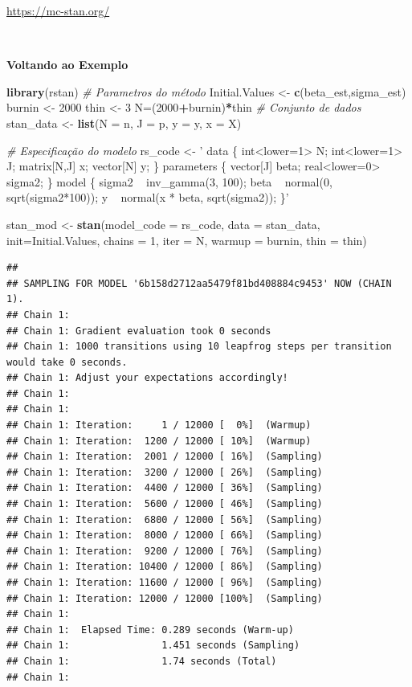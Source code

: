 \documentclass[
]{book}
\newenvironment{Shaded}{\begin{snugshade}}{\end{snugshade}}
\newcommand{\CommentTok}[1]{\textcolor[rgb]{0.56,0.35,0.01}{\textit{#1}}}
\newcommand{\DataTypeTok}[1]{\textcolor[rgb]{0.13,0.29,0.53}{#1}}
\newcommand{\DecValTok}[1]{\textcolor[rgb]{0.00,0.00,0.81}{#1}}
\newcommand{\KeywordTok}[1]{\textcolor[rgb]{0.13,0.29,0.53}{\textbf{#1}}}
\newcommand{\NormalTok}[1]{#1}
\newcommand{\OperatorTok}[1]{\textcolor[rgb]{0.81,0.36,0.00}{\textbf{#1}}}
\newcommand{\StringTok}[1]{\textcolor[rgb]{0.31,0.60,0.02}{#1}}
\begin{document}
\url{https://mc-stan.org/}

\(~\)

\textbf{Voltando ao Exemplo}

\begin{Shaded}
\begin{Highlighting}[]
\KeywordTok{library}\NormalTok{(rstan)}
\CommentTok{# Parametros do método}
\NormalTok{Initial.Values <-}\StringTok{ }\KeywordTok{c}\NormalTok{(beta_est,sigma_est)}
\NormalTok{burnin <-}\StringTok{ }\DecValTok{2000}
\NormalTok{thin <-}\StringTok{ }\DecValTok{3}
\NormalTok{N=(}\DecValTok{2000}\OperatorTok{+}\NormalTok{burnin)}\OperatorTok{*}\NormalTok{thin}
\CommentTok{# Conjunto de dados}
\NormalTok{stan_data <-}\StringTok{ }\KeywordTok{list}\NormalTok{(}\DataTypeTok{N =}\NormalTok{ n, }\DataTypeTok{J =}\NormalTok{ p, }\DataTypeTok{y =}\NormalTok{ y, }\DataTypeTok{x =}\NormalTok{ X)}

\CommentTok{# Especificação do modelo}
\NormalTok{rs_code <-}\StringTok{ '}
\StringTok{  data \{}
\StringTok{    int<lower=1> N;}
\StringTok{    int<lower=1> J;}
\StringTok{    matrix[N,J] x;}
\StringTok{    vector[N] y;}
\StringTok{  \}}
\StringTok{  parameters \{}
\StringTok{    vector[J] beta;}
\StringTok{    real<lower=0> sigma2;}
\StringTok{  \}}
\StringTok{  model \{}
\StringTok{    sigma2 ~ inv_gamma(3, 100);}
\StringTok{    beta ~ normal(0, sqrt(sigma2*100));}
\StringTok{    y ~ normal(x * beta, sqrt(sigma2));}
\StringTok{\}'}

\NormalTok{stan_mod <-}\StringTok{ }\KeywordTok{stan}\NormalTok{(}\DataTypeTok{model_code =}\NormalTok{ rs_code, }\DataTypeTok{data =}\NormalTok{ stan_data, }\DataTypeTok{init=}\NormalTok{Initial.Values,}
            \DataTypeTok{chains =} \DecValTok{1}\NormalTok{, }\DataTypeTok{iter =}\NormalTok{ N, }\DataTypeTok{warmup =}\NormalTok{ burnin, }\DataTypeTok{thin =}\NormalTok{ thin)}
\end{Highlighting}
\end{Shaded}

\begin{verbatim}
## 
## SAMPLING FOR MODEL '6b158d2712aa5479f81bd408884c9453' NOW (CHAIN 1).
## Chain 1: 
## Chain 1: Gradient evaluation took 0 seconds
## Chain 1: 1000 transitions using 10 leapfrog steps per transition would take 0 seconds.
## Chain 1: Adjust your expectations accordingly!
## Chain 1: 
## Chain 1: 
## Chain 1: Iteration:     1 / 12000 [  0%]  (Warmup)
## Chain 1: Iteration:  1200 / 12000 [ 10%]  (Warmup)
## Chain 1: Iteration:  2001 / 12000 [ 16%]  (Sampling)
## Chain 1: Iteration:  3200 / 12000 [ 26%]  (Sampling)
## Chain 1: Iteration:  4400 / 12000 [ 36%]  (Sampling)
## Chain 1: Iteration:  5600 / 12000 [ 46%]  (Sampling)
## Chain 1: Iteration:  6800 / 12000 [ 56%]  (Sampling)
## Chain 1: Iteration:  8000 / 12000 [ 66%]  (Sampling)
## Chain 1: Iteration:  9200 / 12000 [ 76%]  (Sampling)
## Chain 1: Iteration: 10400 / 12000 [ 86%]  (Sampling)
## Chain 1: Iteration: 11600 / 12000 [ 96%]  (Sampling)
## Chain 1: Iteration: 12000 / 12000 [100%]  (Sampling)
## Chain 1: 
## Chain 1:  Elapsed Time: 0.289 seconds (Warm-up)
## Chain 1:                1.451 seconds (Sampling)
## Chain 1:                1.74 seconds (Total)
## Chain 1:
\end{verbatim}
\end{document}
